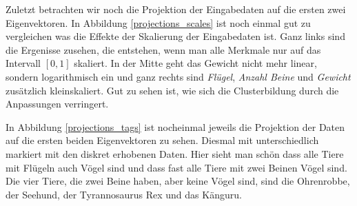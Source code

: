  
 Zuletzt betrachten wir noch die Projektion der Eingabedaten auf die ersten zwei  Eigenvektoren. In Abbildung \ref{projections_scales} ist noch einmal gut zu vergleichen was die Effekte der Skalierung der Eingabedaten ist. Ganz links sind die Ergenisse zusehen, die entstehen, wenn man alle Merkmale nur auf das Intervall $[0, 1]$ skaliert. In der Mitte geht das Gewicht nicht mehr linear, sondern logarithmisch ein und ganz rechts sind \emph{Flügel}, \emph{Anzahl Beine} und \emph{Gewicht} zusätzlich kleinskaliert. Gut zu sehen ist, wie sich die Clusterbildung durch die Anpassungen verringert.
 
 In Abbildung \ref{projections_tags} ist nocheinmal jeweils die Projektion der Daten auf die ersten beiden Eigenvektoren zu sehen. Diesmal mit unterschiedlich markiert mit den diskret erhobenen Daten. Hier sieht man \zb schön dass alle Tiere mit Flügeln auch Vögel sind und dass fast alle Tiere mit zwei Beinen Vögel sind. Die vier Tiere, die zwei Beine haben, aber keine Vögel sind, sind die Ohrenrobbe, der Seehund, der Tyrannosaurus Rex und das Känguru.


